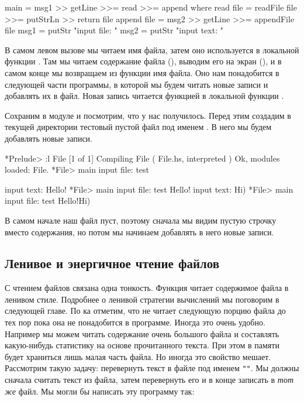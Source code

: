 \begin{code}
main = msg1 >> getLine >>= read >>= append
    where read   file = readFile file >>= putStrLn >> return file
          append file = msg2 >> getLine >>= appendFile file
          msg1        = putStr "input file: "
          msg2        = putStr "input text: "
\end{code}

В самом левом вызове  мы читаем имя файла, затем оно
используется в локальной функции . Там мы читаем содержание
файла (), выводим его на экран (), и в самом
конце мы возвращаем из функции имя файла. Оно нам понадобится в
следующей части программы, в которой мы будем читать новые записи и
добавлять их в файл. Новая запись читается функцией  в
локальной функции .

Сохраним в модуле  и посмотрим, что у нас получилось. Перед
этим создадим в текущей директории тестовый пустой файл под именем
. В него мы будем добавлять новые записи.


\begin{code}
*Prelude> :l File
[1 of 1] Compiling File             ( File.hs, interpreted )
Ok, modules loaded: File.
*File> main
input file: test

input text: Hello!
*File> main
input file: test
Hello!
input text: Hi)
*File> main
input file: test
Hello!Hi)
\end{code}

В самом начале наш файл пуст, поэтому сначала мы видим пустую строчку
вместо содержания, но потом мы начинаем добавлять в него новые записи.

\subsection{Ленивое и энергичное чтение файлов}

С чтением файлов связана одна тонкость. Функция  читает
содержимое файла в ленивом стиле. Подробнее о ленивой стратегии
вычислений мы поговорим в следующей главе. По ка отметим, что
 не читает следующую порцию файла до тех пор пока она не
понадобится в программе. Иногда это очень удобно. Например мы можем
читать содержание очень большого файла и составлять какую-нибудь
статистику на основе прочитанного текста. При этом в памяти будет
храниться лишь малая часть файла. Но иногда это свойство мешает.
Рассмотрим такую задачу: перевернуть текст в файле под именем
\In{}\verb!"!\verb!"!\In{}. Мы должны сначала считать текст из
файла, затем перевернуть его и в конце записать в \emph{тот же} файл. Мы
могли бы написать эту программу так:


